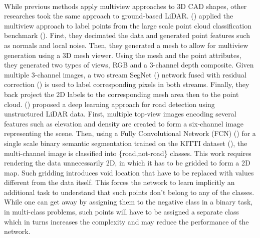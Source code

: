\documentclass[final,3p,times,twocolumn,authoryear]{elsarticle}
\begin{document}
\\While previous methods apply multiview approaches to 3D CAD shapes, other researches took the same approach to ground-based LiDAR. (\cite{Boulch_3D}) applied the multiview approach to label points from the large scale point cloud classification benchmark (\cite{hackel2017semantic3d}). First, they decimated the data and generated point features such as normals and local noise. Then, they generated a mesh to allow for multiview generation using a 3D mesh viewer. Using the mesh and the point attributes, they generated two types of views, RGB and a 3-channel depth composite. Given multiple 3-channel images, a two stream SegNet (\cite{Segnet_PAMI}) network fused with residual correction (\cite{Audebert2016SemanticSO}) is used to label corresponding pixels in both streams. Finally, they back project the 2D labels to the corresponding mesh area then to the point cloud. (\cite{Luca}) proposed a deep learning approach for road detection using unstructured LiDAR data. First, multiple top-view images encoding several features such as elevation and density are created to form a six-channel image representing the scene. Then, using a Fully Convolutional Network (FCN) (\cite{FCN}) for a single scale binary semantic segmentation trained on the KITTI dataset (\cite{KITTI}), the multi-channel image is classified into \{road,not-road\} classes. This work requires rendering the data unnecessarily 2D, in which it has to be gridded to form a 2D map. Such gridding introduces void location that have to be replaced with values different from the data itself. This forces the network to learn implicitly an additional task to understand that such points don't belong to any of the classes. While one can get away by assigning them to the negative class in a binary task, in multi-class problems, such points will have to be assigned a separate class which in turns increases the complexity and may reduce the performance of the network. %
\end{document}
